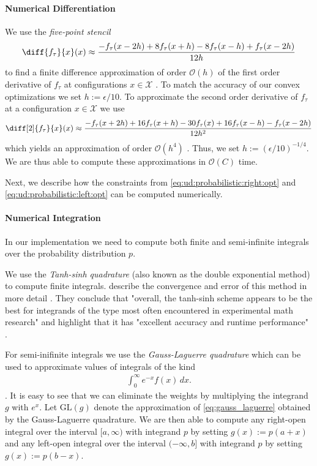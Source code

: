 \paragraph{Numerical Differentiation} We use the \emph{five-point stencil} \begin{align*}
    \diff{f_{\tau}}{x}(x) \approx \frac{-f_{\tau}(x - 2h) + 8 f_{\tau}(x + h) - 8 f_{\tau}(x - h) + f_{\tau}(x - 2h)}{12h}
\end{align*} to find a finite difference approximation of order $\mathcal{O}(h)$ of the first order derivative of $f_{\tau}$ at configurations $x \in \mathcal{X}$ \cite{Sauer2011}. To match the accuracy of our convex optimizations we set $h := \epsilon / 10$. To approximate the second order derivative of $f_{\tau}$ at a configuration $x \in \mathcal{X}$ we use \begin{align*}
    \diff[2]{f_{\tau}}{x}(x) \approx \frac{-f_{\tau}(x + 2h) + 16 f_{\tau}(x+h) - 30 f_{\tau}(x) + 16 f_{\tau}(x-h) - f_{\tau}(x - 2h)}{12 h^2}
\end{align*} which yields an approximation of order $\mathcal{O}(h^4)$ \cite{Sauer2011}. Thus, we set $h := (\epsilon / 10)^{-1/4}$. We are thus able to compute these approximations in $\mathcal{O}(C)$ time.

Next, we describe how the constraints from \autoref{eq:ud:probabilistic:right:opt} and \autoref{eq:ud:probabilistic:left:opt} can be computed numerically.

\paragraph{Numerical Integration} In our implementation we need to compute both finite and semi-infinite integrals over the probability distribution $p$.

We use the \emph{Tanh-sinh quadrature} (also known as the double exponential method) to compute finite integrals. \citeauthor*{Bailey2005} describe the convergence and error of this method in more detail \cite{Bailey2005}. They conclude that "overall, the tanh-sinh scheme appears to be the best
for integrands of the type most often encountered in experimental math research" and highlight that it has "excellent accuracy and runtime performance" \cite{Bailey2005}.

For semi-inifinite integrals we use the \emph{Gauss-Laguerre quadrature} which can be used to approximate values of integrals of the kind \begin{align}\label{eq:gauss_laguerre}
    \int_0^{\infty} e^{-x} f(x) \,dx.
\end{align} \cite{Weisstein}. It is easy to see that we can eliminate the weights by multiplying the integrand $g$ with $e^x$. Let $\text{GL}(g)$ denote the approximation of \autoref{eq:gauss_laguerre} obtained by the Gauss-Laguerre quadrature. We are then able to compute any right-open integral over the interval $[{a,\infty})$ with integrand $p$ by setting $g(x) := p(a+x)$ and any left-open integral over the interval $({-\infty,b}]$ with integrand $p$ by setting $g(x) := p(b-x)$.

